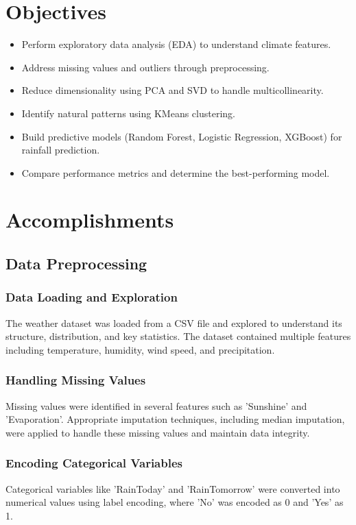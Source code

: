\documentclass[12pt]{article}
\begin{document}
\section{Objectives}
\begin{itemize}
    \item Perform exploratory data analysis (EDA) to understand climate features.
    \item Address missing values and outliers through preprocessing.
    \item Reduce dimensionality using PCA and SVD to handle multicollinearity.
    \item Identify natural patterns using KMeans clustering.
    \item Build predictive models (Random Forest, Logistic Regression, XGBoost) for rainfall prediction.
    \item Compare performance metrics and determine the best-performing model.
\end{itemize}


\section{Accomplishments}
\subsection{Data Preprocessing}
\subsubsection{Data Loading and Exploration}
The weather dataset was loaded from a CSV file and explored to understand its structure, distribution, and key statistics. The dataset contained multiple features including temperature, humidity, wind speed, and precipitation.

\subsubsection{Handling Missing Values}
Missing values were identified in several features such as 'Sunshine' and 'Evaporation'. Appropriate imputation techniques, including median imputation, were applied to handle these missing values and maintain data integrity.

\subsubsection{Encoding Categorical Variables}
Categorical variables like 'RainToday' and 'RainTomorrow' were converted into numerical values using label encoding, where 'No' was encoded as 0 and 'Yes' as 1.
\end{document}
